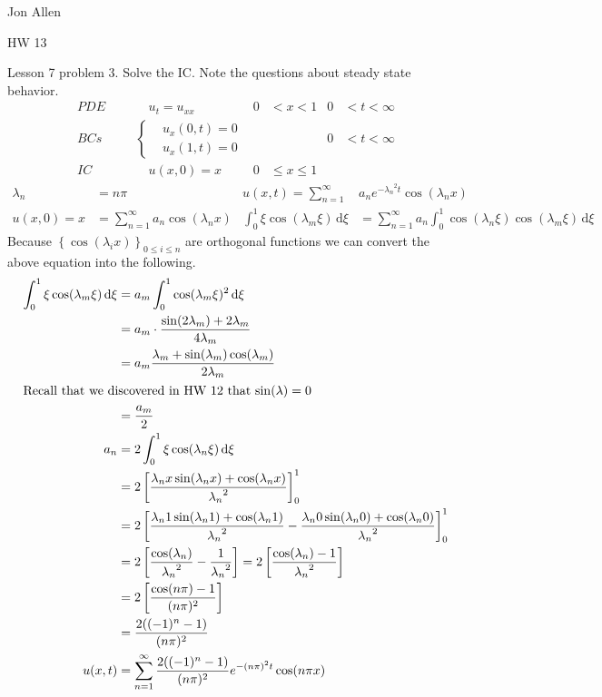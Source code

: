 \documentclass{article}
\begin{document}
Jon Allen

HW 13

Lesson 7 problem 3. Solve the IC. Note the questions about steady state behavior.
\begin{align*}
  PDE&&&\quad u_t=u_{xx}&0&<x<1&0&<t<\infty\\
  BCs&&&\left\{
  \begin{aligned}
    &u_x(0,t)=0\\
    &u_x(1,t)=0
  \end{aligned}
  \right.&&&0&<t<\infty\\
  IC&&&\quad u(x,0)=x&0&\leq x\leq 1
\end{align*}
\begin{align*}
  \lambda_n&=n\pi &
  u(x,t)=\sum\limits_{n=1}^\infty&{a_ne^{-{\lambda_n}^2t}\cos(\lambda_n x)}\\
  u(x,0)=x&=\sum\limits_{n=1}^\infty{a_n\cos(\lambda_n x)}&
  \int_0^1{\xi\cos(\lambda_m\xi)\,\mathrm{d}\xi}&=\sum\limits_{n=1}^\infty{a_n\int_0^1{\cos(\lambda_n\xi)\cos(\lambda_m\xi)\,\mathrm{d}\xi}}
\end{align*}
Because $\left\{\cos(\lambda_ix)\right\}_{0\leq i\leq n}$ are orthogonal functions we can convert the above equation into the following.
\begin{align*}
  \int_0^1{\xi\cos(\lambda_m\xi)\,\mathrm{d}\xi}&=a_m\int_0^1{\cos(\lambda_m\xi)^2\,\mathrm{d}\xi}\\
  &=a_m\cdot\frac{\sin(2\lambda_m)+2\lambda_m}{4\lambda_m}\\
  &=a_m\frac{\lambda_m+\sin(\lambda_m)\cos(\lambda_m)}{2\lambda_m}\\
  \intertext{Recall that we discovered in HW 12 that $\sin(\lambda)=0$}
  &=\frac{a_m}{2}\\
  a_n&=2\int_0^1{\xi\cos(\lambda_n\xi)\,\mathrm{d}\xi}\\
  &=2\left[\frac{\lambda_nx\sin(\lambda_nx)+\cos(\lambda_nx)}{{\lambda_n}^2}\right]_0^1\\
  &=2\left[\frac{\lambda_n1\sin(\lambda_n1)+\cos(\lambda_n1)}{{\lambda_n}^2}-\frac{\lambda_n0\sin(\lambda_n0)+\cos(\lambda_n0)}{{\lambda_n}^2}\right]_0^1\\
  &=2\left[\frac{\cos(\lambda_n)}{{\lambda_n}^2}-\frac{1}{{\lambda_n}^2}\right]=2\left[\frac{\cos(\lambda_n)-1}{{\lambda_n}^2}\right]\\
  &=2\left[\frac{\cos(n\pi)-1}{(n\pi)^2}\right]\\
  &=\frac{2((-1)^{n}-1)}{(n\pi)^2}\\
  u(x,t)&=\sum\limits_{n=1}^\infty{\frac{2((-1)^{n}-1)}{(n\pi)^2}e^{-(n\pi)^2t}\cos(n\pi x)}\\
\end{align*}
\end{document}

